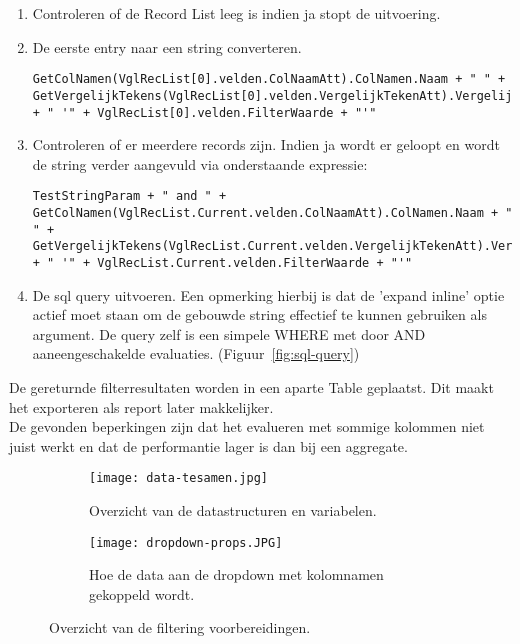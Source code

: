 \begin{itemize}
    \begin{enumerate}
        \item Controleren of de Record List leeg is indien ja stopt de uitvoering.
        \item De eerste entry naar een string converteren. 
\begin{lstlisting}
GetColNamen(VglRecList[0].velden.ColNaamAtt).ColNamen.Naam + " " + GetVergelijkTekens(VglRecList[0].velden.VergelijkTekenAtt).VergelijkTekens.Teken + " '" + VglRecList[0].velden.FilterWaarde + "'"
\end{lstlisting}
        \item Controleren of er meerdere records zijn. Indien ja wordt er geloopt en wordt de string verder aangevuld via onderstaande expressie:
\begin{lstlisting}
TestStringParam + " and " + GetColNamen(VglRecList.Current.velden.ColNaamAtt).ColNamen.Naam + " " + GetVergelijkTekens(VglRecList.Current.velden.VergelijkTekenAtt).VergelijkTekens.Teken + " '" + VglRecList.Current.velden.FilterWaarde + "'"
\end{lstlisting}
        \item De sql query uitvoeren. Een opmerking hierbij is dat de 'expand inline' optie actief moet staan om de gebouwde string effectief te kunnen gebruiken als argument. De query zelf is een simpele WHERE met door AND aaneengeschakelde evaluaties. (Figuur~\ref{fig:sql-query})
    \end{enumerate}
    De gereturnde filterresultaten worden in een aparte Table geplaatst. Dit maakt het exporteren als report later makkelijker.\\
    De gevonden beperkingen zijn dat het evalueren met sommige kolommen niet juist werkt en dat de performantie lager is dan bij een aggregate.
\end{itemize}


\begin{figure}[h!]
    \centering
    \begin{subfigure}[b]{0.3\linewidth}
        \texttt{[image: data-tesamen.jpg]}
        \caption{Overzicht van de datastructuren en variabelen.}
    \end{subfigure}
    \begin{subfigure}[b]{0.5\linewidth}
        \texttt{[image: dropdown-props.JPG]}
        \caption{Hoe de data aan de dropdown met kolomnamen gekoppeld wordt.}
    \end{subfigure}
    \caption{Overzicht van de filtering voorbereidingen.}
    \label{fig:data-en-dropdown}
\end{figure}


